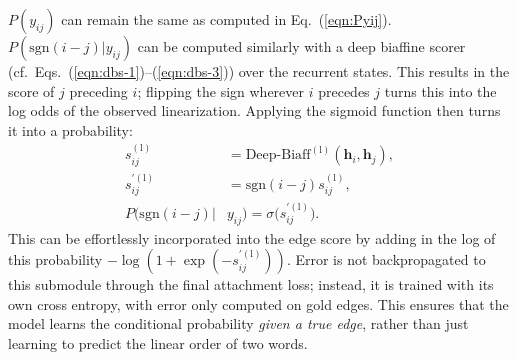 \documentclass[11pt,a4paper]{article}
\begin{document}
$P(y_{ij})$ can remain the same as computed in Eq.~(\ref{eqn:Pyij}).
$P(\text{sgn}(i-j) | y_{ij})$ can be computed similarly  with a deep biaffine scorer (cf.\ Eqs.~(\ref{eqn:dbs-1})--(\ref{eqn:dbs-3})) over the recurrent states.
This results in the score of $j$ preceding $i$; flipping the sign wherever $i$ precedes $j$ turns this into the log odds of the observed linearization.
Applying the sigmoid function then turns it into a probability:
\begin{align}
  s_{ij}^{(\text{l})} &= \text{Deep-Biaff}^{(\text{l})}(\mathbf{h}_i, \mathbf{h}_j) ,\\
  s_{ij}^{\prime(\text{l})} &= \text{sgn}(i-j)s_{ij}^{(\text{l})} ,\\
  P(\text{sgn}(i-j) |& y_{ij}) = \sigma\big(s_{ij}^{\prime(\text{l})}\big) \label{eqn:linearization} .
\end{align}
This can be effortlessly incorporated into the edge score by adding in the log of this probability $-\log(1+\exp(-s_{ij}^{\prime(\text{l})}))$. Error is not backpropagated to this submodule through the final attachment loss; instead, it is trained with its own cross entropy, with error only computed on gold edges. This ensures that the model learns the conditional probability \emph{given a true edge}, rather than just learning to predict the linear order of two words.
\end{document}
